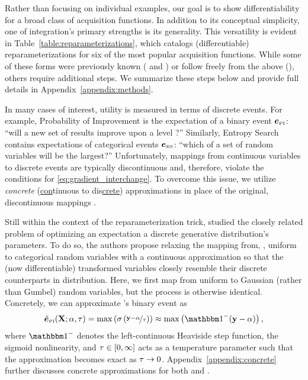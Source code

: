 Rather than focusing on individual examples, our goal is to show differentiability for a broad class of \MC acquisition functions. 
% 
In addition to its conceptual simplicity, one of \MC integration's primary strengths is its generality. This versatility is evident in Table~\ref{table:reparameterizations}, which catalogs (differentiable) reparameterizations for six of the most popular acquisition functions. While some of these forms were previously known (\EI{} and \KG) or follow freely from the above (\SR), others require additional steps. We summarize these steps below and provide full details in Appendix~\ref{appendix:methods}.


In many cases of interest, utility is measured in terms of discrete events. For example, Probability of Improvement \cite{kushner1964new,viana2010surrogate} is the expectation of a binary event \(\boldsymbol{e}_{\scriptscriptstyle{\ensuremath{\operatorname{PI}}}}\): ``will a new set of results improve upon a level \level?''
% 
Similarly, Entropy Search \cite{hennig-jmlr12a} contains expectations of categorical events \(\boldsymbol{e}_{\scriptscriptstyle{\ensuremath{\operatorname{ES}}}}\): ``which of a set of random variables will be the largest?'' 
% 
Unfortunately, mappings from continuous variables \Y{} to discrete events \event{} are typically discontinuous and, therefore, violate the conditions for \eqref{eq:gradient_interchange}. To overcome this issue, we utilize \emph{concrete} (\underline{con}tinuous to dis\underline{crete}) approximations in place of the original, discontinuous mappings \cite{jang2016categorical,maddison2016concrete}. 

Still within the context of the reparameterization trick, \cite{jang2016categorical,maddison2016concrete} studied the closely related problem of optimizing an expectation \wrt{} a discrete generative distribution's parameters. To do so, the authors propose relaxing the mapping from, \eg{}, uniform to categorical random variables with a continuous approximation so that the (now differentiable) transformed variables closely resemble their discrete counterparts in distribution. Here, we first map from uniform to Gaussian (rather than Gumbel) random variables, but the process is otherwise identical. Concretely, we can approximate \PI's binary event as
\begin{align}
\tilde{\event}_{\acqSubscript{\PI}}(\X; \level, \temperature)
   	= \max\left(\sigmoid\left(\nicefrac{\Y - \alpha}{\temperature}\right)\right)
    \approx \max\left(\heaviside^{-}(\Y - \level)\right),
\end{align}
where \(\heaviside^{-}\) denotes the left-continuous Heaviside step function, \sigmoid{} the sigmoid nonlinearity, and \(\tau \in [0,\infty]\) acts as a temperature parameter such that the approximation becomes exact as \(\tau \to 0\). Appendix~\ref{appendix:concrete} further discusses concrete approximations for both \PI{} and \ES{}.

